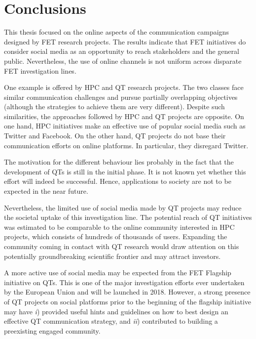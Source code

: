 \chapter*{Conclusions}
This thesis focused on the online aspects of the communication campaigns designed by FET research projects. The results indicate that FET initiatives do consider social media as an opportunity to reach stakeholders and the general public. Nevertheless, the use of online channels is not uniform across disparate FET investigation lines.  

One example is offered by HPC and QT research projects. The two classes face similar communication challenges and pursue partially overlapping objectives (although the strategies to achieve them are very different). Despite such similarities, the approaches followed by HPC and QT projects are opposite. On one hand, HPC initiatives make an effective use of popular social media such as Twitter and Facebook. On the other hand, QT projects do not base their communication efforts on online platforms. In particular, they disregard Twitter.  

The motivation for the different behaviour lies probably in the fact that the development of QTs is still in the initial phase. It is not known yet whether this effort will indeed be successful. Hence, applications to society are not to be expected in the near future. 

Nevertheless, the limited use of social media made by QT projects may reduce the societal uptake of this investigation line. The potential reach of QT initiatives was estimated to be comparable to the online community interested in HPC projects, which consists of hundreds of thousands of users. Expanding the community coming in contact with QT research would draw attention on this potentially groundbreaking scientific frontier and may attract investors.

A more active use of social media may be expected from the FET Flagship initiative on QTs. This is one of the major investigation efforts ever undertaken by the European Union and will be launched in 2018. However, a strong presence of QT projects on social platforms prior to the beginning of the flagship initiative may have \textit{i}) provided useful hints and guidelines on how to best design an effective QT communication strategy, and \textit{ii}) contributed to building a preexisting engaged community.
